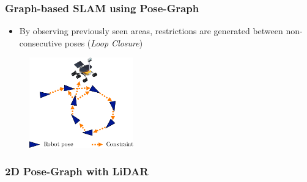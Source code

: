 \begin{frame}
    \frametitle{Graph-based SLAM using Pose-Graph}
   
    \begin{itemize}
    \item By observing previously seen areas, restrictions are generated between non-consecutive poses (\emph{Loop Closure})
    \end{itemize}
   
    \begin{figure}[!h]
    \includegraphics[width=0.4\textwidth]{images/pose_graph_loop_example.pdf}
    \end{figure}
   
   \end{frame}
   
   \begin{frame}[fragile]
    \frametitle{2D Pose-Graph with LiDAR}
   
    \begin{center}
   \end{center}
   
   \end{frame}
   

